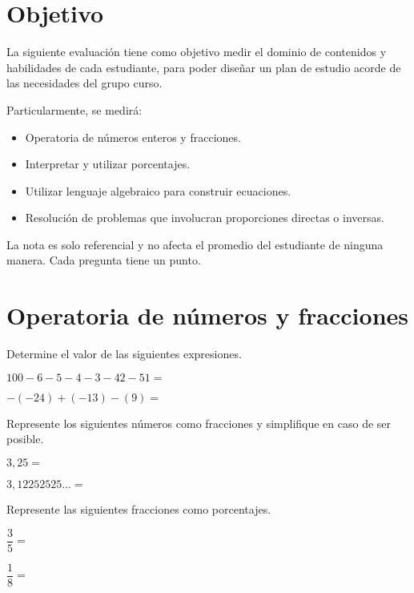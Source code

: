 \documentclass[sin curso]{srs}
\begin{document}
\section{Objetivo}

La siguiente evaluación tiene como objetivo medir el dominio de contenidos y habilidades
de cada estudiante, para poder diseñar un plan de estudio acorde de las necesidades del
grupo curso.

Particularmente, se medirá:
\begin{itemize}[nosep]
  \item Operatoria de números enteros y fracciones.
  \item Interpretar y utilizar porcentajes.
  \item Utilizar lenguaje algebraico para construir ecuaciones.
  \item Resolución de problemas que involucran proporciones directas o inversas.
\end{itemize}

La nota es solo referencial y no afecta el promedio del estudiante de ninguna manera. Cada
pregunta tiene un punto.

\section{Operatoria de números y fracciones}

Determine el valor de las siguientes expresiones.
\begin{preguntas}
  \pregunta $100-6-5-4-3-42-51 =$
  \begin{malla}[height=3cm]
  \end{malla}
  \pregunta $-(-24)+(-13)-(9) =$
  \begin{malla}[height=3cm]
  \end{malla}
\end{preguntas}

Represente los siguientes números como fracciones y simplifique en caso de ser posible.
\begin{preguntas}
  \pregunta $3,25 =$
  \begin{malla}[height=3cm]
  \end{malla}
  \pregunta $3,12252525...=$
  \begin{malla}[height=3cm]
  \end{malla}
\end{preguntas}

Represente las siguientes fracciones como porcentajes.
\begin{preguntas}
  \pregunta $\dfrac{3}{5} =$
  \begin{malla}[height=3cm]
  \end{malla}
  \pregunta $\dfrac{1}{8} =$
  \begin{malla}[height=3cm]
  \end{malla}
\end{preguntas}
\end{document}

